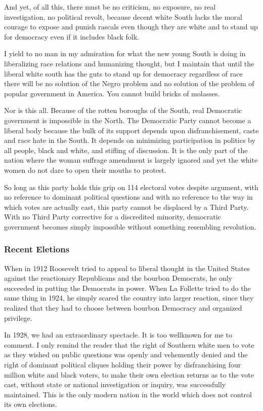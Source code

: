 \documentclass[letterpaper,10pt,english]{jupyterBook}
\begin{document}
\sphinxAtStartPar
And yet, of all this, there must be no criticism, no exposure, no real investigation, no political revolt, because decent white South lacks the moral courage to expose and punish rascals even though they are white and to stand up for democracy even if it includes black folk.

\sphinxAtStartPar
I yield to no man in my admiration for what the new young South is doing in liberalizing race relations and humanizing thought, but I maintain that until the liberal white south has the guts to stand up for democracy regardless of race there will be no solution of the Negro problem and no solution of the problem of popular government in America. You cannot build bricks of molasses.

\sphinxAtStartPar
Nor is this all. Because of the rotten boroughs of the South, real Democratic government is impossible in the North. The Democratic Party cannot become a liberal body because the bulk of its support depends upon disfranchisement, caste and race hate in the South. It depends on minimizing participation in politics by all people, black and white, and stifling of discussion. It is the only part of the nation where the woman suffrage amendment is largely ignored and yet the white women do not dare to open their mouths to protest.

\sphinxAtStartPar
So long as this party holds this grip on 114 electoral votes despite argument, with no reference to dominant political questions and with no reference to the way in which votes are actually cast, this party cannot be displaced by a Third Party. With no Third Party corrective for a discredited minority, democratic government becomes simply impossible without something resembling revolution.


\subsubsection{Recent Eletions}
\label{\detokenize{Volumes/36/05/negro_citizen:recent-eletions}}
\sphinxAtStartPar
When in 1912 Roosevelt tried to appeal to liberal thought in the United States against the reactionary Republicans and the bourbon Democrats, he only succeeded in putting the Democrats in power. When La Follette tried to do the same thing in 1924, he simply scared the country into larger reaction, since they realized that they had to choose between bourbon Democracy and organized privilege.

\sphinxAtStartPar
In 1928, we had an extraordinary spectacle. It is too well\sphinxhyphen{}known for me to comment. I only remind the reader that the right of Southern white men to vote as they wished on public questions was openly and vehemently denied and the right of dominant political cliques holding their power by disfranchising four million white and black voters, to make their own election returns as to the vote cast, without state or national investigation or inquiry, was successfully maintained. This is the only modern nation in the world which does not control its own elections.
\end{document}
